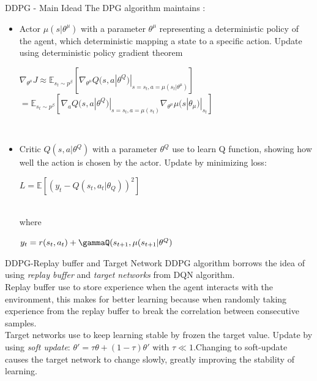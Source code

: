 \documentclass{beamer}
\begin{document}
\begin{frame}{DDPG - Main Idead}
The DPG algorithm maintains :
\begin{itemize}
    \item Actor $\mu(s|\theta^\mu)$ with a parameter
$\theta^\mu$ representing a deterministic policy of the agent, which
deterministic mapping a state to a specific action.
Update using deterministic policy gradient theorem
\begin{center}
$\nabla_{\theta^\mu}J
\approx \mathbb{E}_{s_t \sim p^\beta}[\nabla_{\theta^\mu} Q(s,a|\theta^Q)|_{s=s_t,a=\mu(s_t|\theta^\mu)}]$\\
\vspace{0.15cm}
$=  \mathbb{E}_{s_t \sim p^\beta}[\nabla_a Q(s,a|\theta^Q)|_{s=s_t,a=\mu(s_t)}\nabla_{\theta^\mu}\mu(s|\theta_\mu)|_{s_t}]$
\end{center}\\
\vspace{0.5cm}\pause
    \item Critic $Q(s,a|\theta^Q)$ with a parameter $\theta^Q$ use
    to learn Q function, showing how well the action is
chosen by the actor. Update by minimizing loss:
\begin{center}
$L = \mathbb{E}[(y_t - Q(s_t,a_t|\theta_Q))^2] $
\end{center}\\
where 
\begin{center}
$y_t = r(s_t,a_t) + \gammaQ(s_{t+1},\mu(s_{t+1}|\theta^Q)$
\end{center}
\end{itemize} 
\end{frame}

\begin{frame}{DDPG-Replay buffer and Target Network}
DDPG algorithm borrows the idea of using \textit{replay buffer} and \textit{target networks} from DQN algorithm.\\
\vspace{0.5cm}
\pause 
Replay buffer use to store experience when the agent interacts with the environment, this makes for better learning because when randomly taking experience from the replay buffer to break the correlation between consecutive samples.\\
\pause
\vspace{0.5cm}
Target networks use to keep learning stable by frozen the target value. Update by using \textit{soft update}: $\theta' = \tau\theta + (1-\tau)\theta'$ with $\tau \ll 1$.\pause Changing to soft-update causes the target network to change slowly, greatly improving the stability of learning. 
\end{frame}
\end{document}
